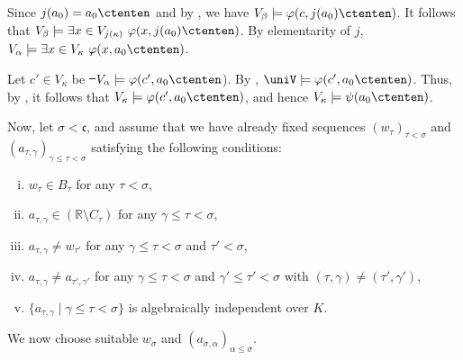  Since $j(a_0)=a_0\ctenten$ and by , we have
 $V_\beta\models\varphi(c,j(a_0)\ctenten)$. It follows that
 $V_\beta\models\exists x\in V_{j(\kappa)}\ \varphi(x,j(a_0)\ctenten)$. By elementarity
 of $j$, $V_\alpha\models\exists x\in V_{\kappa}\ \varphi(x,a_0\ctenten)$.

 Let $c'\in V_\kappa$ be \st\ $V_\alpha\models \varphi(c',a_0\ctenten$). By
 , $\uniV\models \varphi(c',a_0\ctenten)$.
 Thus, by , it follows that
 $V_\kappa\models \varphi(c',a_0\ctenten)$, and hence
 $V_\kappa\models \psi(a_0\ctenten)$.



Now, let $\sigma<\mathfrak{c}$, and assume that we have already fixed sequences $(w_\tau)_{\tau<\sigma}$ and $(a_{\tau,\gamma})_{\gamma\leq\tau<\sigma}$ satisfying the following conditions:
 \begin{enumerate}[(i)]
\item\label{item::cond1} $w_\tau\in B_\tau$ for any $\tau<\sigma$,
\item $a_{\tau,\gamma}\in (\mathbb{R}\setminus C_\tau)$ for any $\gamma\leq\tau<\sigma$,
\item $a_{\tau,\gamma}\neq w_{\tau'}$ for any $\gamma\leq\tau<\sigma$ and $\tau'<\sigma$,
\item $a_{\tau,\gamma}\neq a_{\tau',\gamma'}$ for any $\gamma\leq\tau<\sigma$ and $\gamma'\leq \tau'<\sigma$ with $(\tau,\gamma)\neq(\tau',\gamma')$,
\item\label{item::cond5} $\{a_{\tau,\gamma}\mid \gamma\leq\tau<\sigma\}$ is algebraically independent over $K$.
 \end{enumerate}
 We now choose suitable $w_\sigma$ and $(a_{\sigma,\alpha})_{\alpha\leq\sigma}$.
